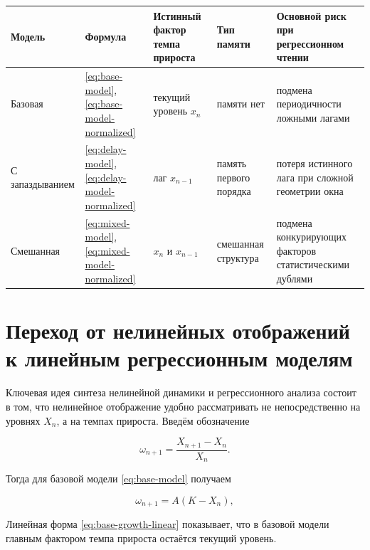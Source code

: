 {\def\LTcaptype{none}
\begin{longtable}[]{@{}
  >{\raggedright\arraybackslash}p{}
  >{\raggedright\arraybackslash}p{}
  >{\raggedright\arraybackslash}p{}
  >{\raggedright\arraybackslash}p{}
  >{\raggedright\arraybackslash}p{}@{}}
\toprule\noalign{}
Модель & Формула & Истинный фактор темпа прироста & Тип памяти & Основной риск при регрессионном чтении \\
\midrule\noalign{}
\endhead
\bottomrule\noalign{}
\endlastfoot
Базовая & \eqref{eq:base-model}, \eqref{eq:base-model-normalized} & текущий уровень \(x_n\) & памяти нет & подмена периодичности ложными лагами \\
С запаздыванием & \eqref{eq:delay-model}, \eqref{eq:delay-model-normalized} & лаг \(x_{n-1}\) & память первого порядка & потеря истинного лага при сложной геометрии окна \\
Смешанная & \eqref{eq:mixed-model}, \eqref{eq:mixed-model-normalized} & \(x_n\) и \(x_{n-1}\) & смешанная структура & подмена конкурирующих факторов статистическими дублями \\
\end{longtable}
}

\section{Переход от нелинейных отображений к линейным регрессионным моделям}
\label{sec:from-maps-to-regression}

Ключевая идея синтеза нелинейной динамики и регрессионного анализа состоит в том, что нелинейное отображение удобно рассматривать не непосредственно на уровнях \(X_n\), а на темпах прироста. Введём обозначение

\begin{equation}
\omega_{n+1}=\frac{X_{n+1}-X_n}{X_n}.
\label{eq:growth-rate}
\end{equation}

Тогда для базовой модели \eqref{eq:base-model} получаем

\begin{equation}
\omega_{n+1}=A(K-X_n),
\label{eq:base-growth-linear}
\end{equation}

Линейная форма \eqref{eq:base-growth-linear} показывает, что в базовой модели главным фактором темпа прироста остаётся текущий уровень.

